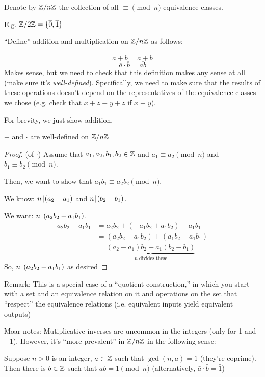 \documentclass[notes.tex]{subfiles}
\begin{document}
\begin{definition}
	Denote by $\mathbb{Z}/n\mathbb{Z}$ the collection of all $\equiv\pmod n$ equivalence classes.
\end{definition}

E.g. $\mathbb{Z}/2\mathbb{Z} = \{\overline{0}, \overline{1}\}$

``Define'' addition and multiplication on $\mathbb{Z}/n\mathbb{Z}$ as follows:

\[
	\overline a + \overline b = \overline{a+b}
\]
\[
	\overline a \cdot \overline b = \overline{ab}
\]
Makes sense, but we need to check that this definition makes any sense at all (make sure it's \emph{well-defined}). Specifically, we need to make sure that the results of these operations doesn't depend on the representatives of the equivalence classes we chose (e.g. check that $\bar x + \bar z \equiv \bar y + \bar z$ if $x \equiv y$).

For brevity, we just show addition.

\begin{theorem}
	$+$ and $\cdot$ are well-defined on $\mathbb{Z}/n\mathbb{Z}$
\end{theorem}
\begin{proof}
	(of $\cdot$)
	Assume that $a_1, a_2, b_1, b_2\in\mathbb{Z}$ and $a_1\equiv a_2\pmod n$ and $b_1\equiv b_2\pmod n$.

	Then, we want to show that $a_1b_1\equiv a_2b_2\pmod n$.

	We know: $n\mkern2mu|\mkern1mu(a_2-a_1)$ and $n\mkern2mu|\mkern1mu(b_2-b_1)$.

	We want: $n\mkern2mu|\mkern1mu(a_2b_2-a_1b_1)$.
	\begin{align*}
		a_2b_2 - a_1b_1 &= a_2b_2 + (-a_1b_2 + a_1b_2) - a_1b_1\\
		&= (a_2b_2-a_1b_2) + (a_1b_2-a_1b_1)\\
		&= \underbrace{(a_2-a_1)b_2 + a_1(b_2-b_1)}_{n\text{ divides these}}
	\end{align*}
	So, $n\mkern2mu|\mkern1mu (a_2b_2 - a_1b_1)$ as desired
\end{proof}

Remark: This is a special case of a ``quotient construction,'' in which you start with a set and an equivalence relation on it and operations on the set that ``respect'' the equivalence relations (i.e. equivalent inputs yield equivalent outputs)

Moar notes:
Mutiplicative inverses are uncommon in the integers (only for 1 and $-1$). However, it's ``more prevalent'' in $\mathbb{Z}/n\mathbb{Z}$ in the following sense:
\begin{theorem}
	Suppose $n>0$ is an integer, $a\in\mathbb{Z}$ such that $\gcd(n, a) = 1$ (they're coprime).
	Then there is $b\in\mathbb{Z}$ such that $ab = 1 \pmod n$ (alternatively, $\bar a \cdot \bar b = \bar 1$)
\end{theorem}
\end{document}
